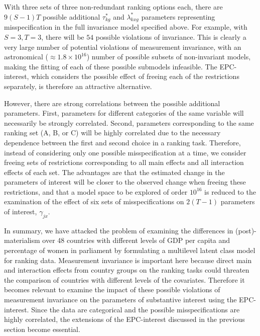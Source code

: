 \documentclass[letterpaper,12pt]{article}
\begin{document}
With three sets of three non-redundant ranking options each, there are $9 (S - 1) T$ possible additional $\tau^{*}_{k g}$ and $\lambda^{*}_{k x g}$ parameters representing misspecification in the full invariance model specified above. For example, with $S=3, T=3$, there will be $54$ possible violations of invariance. %
This is clearly a very large number of potential violations of measurement invariance, with an astronomical ($\approx 1.8 \times 10^{16}$) number of possible subsets of non-invariant models, making the fitting of each of these possible submodels infeasible. The EPC-interest, which considers the possible effect of freeing each of the restrictions separately, is therefore an attractive alternative. 

However, there are strong correlations between the possible additional parameters. First, parameters for different categories of the same variable will necessarily be strongly correlated. Second, parameters corresponding to the same ranking set (A, B, or C) will be highly correlated due to the necessary dependence between the first and second choice in a ranking task. Therefore, instead of considering only one possible misspecification at a time, we consider freeing sets of restrictions corresponding to all main effects and all interaction effects of each set. The advantages are that the estimated change in the parameters of interest will be closer to the observed change when freeing these restrictions, and that a model space to be explored of order $10^{16}$ is reduced to the examination of the effect of six sets of misspecifications on $2 (T-1)$  parameters of interest, $\gamma_{jx}$.

\bigskip
In summary, we have attacked the problem of examining the differences in (post)-materialism over 48 countries with different levels of GDP per capita and percentage of women in parliament by formulating a multilevel latent class model for ranking data. Measurement invariance is important here because direct main and interaction effects from country groups on the ranking tasks could threaten the comparison of countries with different levels of the covariates. Therefore it becomes relevant to examine the impact of these possible violations of measurement invariance on the parameters of substantive interest using the EPC-interest. Since the data are categorical and the possible misspecifications are highly correlated, the extensions of the EPC-interest discussed in the previous section become essential.
\end{document}
